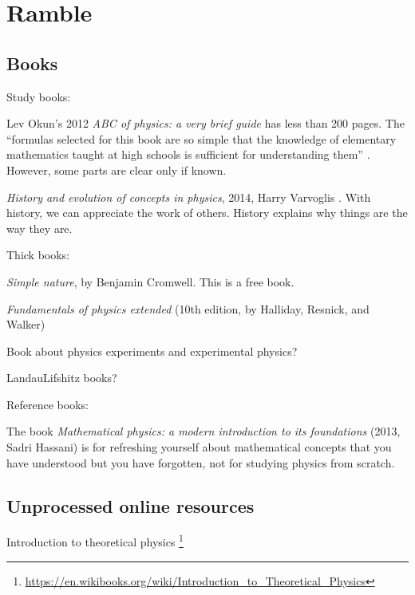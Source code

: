 \chapter{Ramble}

\section{Books}

Study books:

Lev Okun's 2012 \emph{ABC of physics: a very brief guide} \cite{okun2012abc} has less than 200 pages.
The \enquote{formulas selected for this book are so simple that the knowledge of
elementary mathematics taught at high schools is sufficient
for understanding them} \cite[p.~vi]{okun2012abc}.
However, some parts are clear only if known.

\emph{History and evolution of concepts in physics}, 2014, Harry Varvoglis \cite{varvoglis2014history}.
With history, we can appreciate the work of others.
History explains why things are the way they are.

Thick books:

\emph{Simple nature}, by Benjamin Cromwell.
This is a free book.

\emph{Fundamentals of physics extended}
(10th edition, by Halliday, Resnick, and Walker)
\cite{halliday2013fundamentals}

Book about physics experiments and experimental physics?

Landau\textendash{}Lifshitz books?

Reference books:

The book \emph{Mathematical physics: a modern introduction to its foundations} (2013, Sadri Hassani)
\cite{hassani2013mathematical}
is for refreshing yourself about mathematical concepts that you have understood but you have forgotten,
not for studying physics from scratch.

\section{Unprocessed online resources}

Introduction to theoretical physics%
\footnote{\url{https://en.wikibooks.org/wiki/Introduction_to_Theoretical_Physics}}

